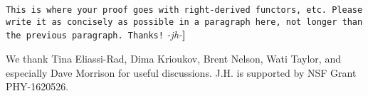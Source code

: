 \documentclass[aps,prl,twocolumn, superscriptaddress,groupedaddress,nofootinbib]{revtex4}
\newcommand{\XXX}[3]{{\color{blue}{\bf [#1: } {\tt #3} {\it -#2-}{\bf ]}}}
\begin{document}
\XXX{ben}{jh}{This is where your proof goes with right-derived functors, etc.
Please write it as concisely as possible in a paragraph here, not longer than the 
previous paragraph. Thanks!}

\vspace{.2cm}
 We thank Tina Eliassi-Rad, Dima Krioukov, Brent Nelson, Wati Taylor,
and especially Dave Morrison for useful discussions. 
J.H. is supported by
NSF Grant PHY-1620526.



\appendix
\end{document}
